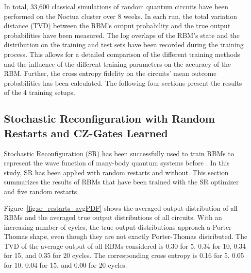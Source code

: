 In total, 33,600 classical simulations of random quantum circuits have been performed 
on the Noctua cluster over 8 weeks. In each run, the total variation distance (TVD)
between the RBM's output probability and the true output probabilities have been measured.
 The log overlaps of the RBM's state and the distribution on the training and test sets have been recorded during the training process. This allows for a detailed comparison
of the different training methods and the influence of the different training parameters on the 
accuracy of the RBM. Further, the cross entropy fidelity on the circuits' mean outcome probabilities
has been calculated. The following four sections present the results of the 4 training setups.

\subsection{Stochastic Reconfiguration with Random Restarts and CZ-Gates Learned}

Stochastic Reconfiguration (SR) has been successfully used to train RBMs to represent the wave function 
of many-body quantum systems before \cite{}. In this study, SR has been applied with random restarts 
and without. 
This section summarizes the results of RBMs that have been trained with the SR optimizer and five random 
restarts.

Figure~\ref{fig:sr_restarts_avgPDF} shows the averaged output distribution of all RBMs and 
the averaged true output distributions of all circuits. With an increasing number of cycles, the 
true output distributions approach a Porter-Thomas shape, even though they are not exactly Porter-Thomas 
distributed.
The TVD of the average output of all RBMs considered 
is 0.30 for 5, 0.34 for 10, 0.34 for 15, and 0.35 for 20 cycles. The corresponding cross entropy is 
0.16 for 5, 0.05 for 10, 0.04 for 15, and 0.00 for 20 cycles.

